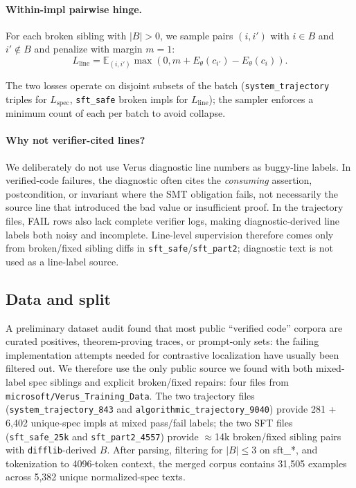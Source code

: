 \documentclass[10pt]{article}
\begin{document}
\paragraph{Within-impl pairwise hinge.}
For each broken sibling with $|B| > 0$, we sample pairs $(i, i')$ with
$i \in B$ and $i' \notin B$ and penalize with margin $m=1$:
\begin{equation}
L_{\text{line}} = \mathbb{E}_{(i,i')} \max\!\left(0, m + E_\theta(c_{i'}) - E_\theta(c_i)\right).
\end{equation}

The two losses operate on disjoint subsets of the batch
(\texttt{system\_trajectory} triples for $L_{\text{spec}}$, \texttt{sft\_safe}
broken impls for $L_{\text{line}}$); the sampler enforces a minimum count of
each per batch to avoid collapse.

\paragraph{Why not verifier-cited lines?}
We deliberately do not use Verus diagnostic line numbers as buggy-line
labels. In verified-code failures, the diagnostic often cites the
\emph{consuming} assertion, postcondition, or invariant where the SMT
obligation fails, not necessarily the source line that introduced the
bad value or insufficient proof. In the trajectory files, FAIL rows also
lack complete verifier logs, making diagnostic-derived line labels both
noisy and incomplete. Line-level supervision therefore comes only from
broken/fixed sibling diffs in \texttt{sft\_safe}/\texttt{sft\_part2};
diagnostic text is not used as a line-label source.

\subsection{Data and split}
\label{sec:methods:data}
A preliminary dataset audit found that most public ``verified code''
corpora are curated positives, theorem-proving traces, or prompt-only
sets: the failing implementation attempts needed for contrastive
localization have usually been filtered out. We therefore use the only
public source we found with both mixed-label spec siblings and explicit
broken/fixed repairs: four files from
\texttt{microsoft/Verus\_Training\_Data}. The two trajectory files
(\texttt{system\_trajectory\_843} and
\texttt{algorithmic\_trajectory\_9040}) provide 281 + 6{,}402
unique-spec impls at mixed pass/fail labels; the two SFT files
(\texttt{sft\_safe\_25k} and \texttt{sft\_part2\_4557}) provide
$\approx$14k broken/fixed sibling pairs with \texttt{difflib}-derived
$B$. After parsing, filtering for $|B| \le 3$ on sft\_*, and tokenization to
4096-token context, the merged corpus contains 31{,}505 examples across
5{,}382 unique normalized-spec texts.
\end{document}
